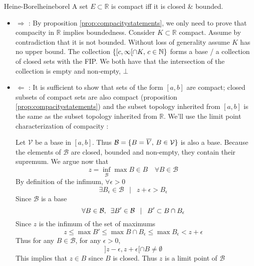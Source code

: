 \begin{mythm}{Heine-Borel}{heineborel}
	A set $E \subset \mathbb{R}$ is compact iff it is closed \& bounded.
\end{mythm}
\begin{myproof}
	\begin{itemize}
		\item $\Rightarrow$ : By proposition \ref{prop:compacitystatements}, we only need to prove that compacity in $\mathbb{R}$ implies boundedness. Consider $K \subset \mathbb{R}$ compact. Assume by contradiction that it is not bounded. Without loss of generality assume $K$ has no upper bound. The collection $\{[c, \infty[ \cap K, \thinspace c \in \mathbb{N}\}$ forms a base / a collection of closed sets with the FIP. We both have that the intersection of the collection is empty and non-empty, $\bot$
		\item $\Leftarrow$ : It is sufficient to show that sets of the form $[a, b]$ are compact; closed subsets of compact sets are also compact (proposition \ref{prop:compacitystatements}) and the subset topology inherited from $[a, b]$ is the same as the subset topology inherited from $\mathbb{R}$. \enskip We'll use the limit point characterization of compacity : \par
		Let $\mathcal{V}$ be a base in $[a, b]$. \enskip Thus $\mathcal{B} = \{B = \overline{V}, \thinspace B \in \mathcal{V}\}$ is also a base. Because the elements of $\mathcal{B}$ are closed, bounded and non-empty, they contain their supremum. We argue now that
		$$z = \inf_{\mathcal{B}} \max B \in B \quad \forall B \in \mathcal{B}$$
		By definition of the infimum, \enskip $\forall \epsilon > 0$
		$$\exists B_\epsilon \in \mathcal{B} \enspace \mid \enspace z + \epsilon > B_\epsilon $$
		Since $\mathcal{B}$ is a base
		$$\forall B \in \mathcal{B}, \enskip \exists B' \in \mathcal{B} \enspace \mid \enspace B' \subset B \cap B_\epsilon$$
		Since $z$ is the infimum of the set of maximums
		$$z \leq \max B' \leq \max B \cap B_\epsilon \leq \max B_\epsilon < z + \epsilon$$
		Thus for any $B \in \mathcal{B}$, for any $\epsilon > 0$,
		$$ ] z - \epsilon, z + \epsilon [ \cap B \neq \emptyset{}$$
		This implies that $z \in B$ since $B$ is closed. Thus $z$ is a limit point of $\mathcal{B}$
	\end{itemize}
\end{myproof}




\pagebreak
